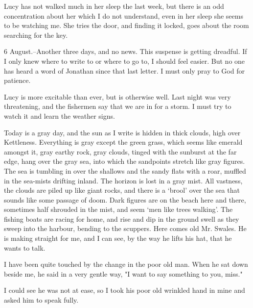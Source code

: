 Lucy has not walked much in her sleep the last week, but there is an odd concentration about her which I do not understand, even in her sleep she seems to be watching me. She tries the door, and finding it locked, goes about the room searching for the key. 

6 August.--Another three days, and no news. This suspense is getting dreadful. If I only knew where to write to or where to go to, I should feel easier. But no one has heard a word of Jonathan since that last letter. I must only pray to God for patience. 

Lucy is more excitable than ever, but is otherwise well. Last night was very threatening, and the fishermen say that we are in for a storm. I must try to watch it and learn the weather signs. 

Today is a gray day, and the sun as I write is hidden in thick clouds, high over Kettleness. Everything is gray except the green grass, which seems like emerald amongst it, gray earthy rock, gray clouds, tinged with the sunburst at the far edge, hang over the gray sea, into which the sandpoints stretch like gray figures. The sea is tumbling in over the shallows and the sandy flats with a roar, muffled in the sea-mists drifting inland. The horizon is lost in a gray mist. All vastness, the clouds are piled up like giant rocks, and there is a `brool' over the sea that sounds like some passage of doom. Dark figures are on the beach here and there, sometimes half shrouded in the mist, and seem `men like trees walking'. The fishing boats are racing for home, and rise and dip in the ground swell as they sweep into the harbour, bending to the scuppers. Here comes old Mr. Swales. He is making straight for me, and I can see, by the way he lifts his hat, that he wants to talk. 

I have been quite touched by the change in the poor old man. When he sat down beside me, he said in a very gentle way, "I want to say something to you, miss." 

I could see he was not at ease, so I took his poor old wrinkled hand in mine and asked him to speak fully. 

